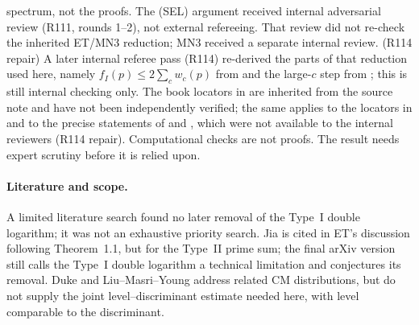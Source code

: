 \documentclass[10pt,reqno]{amsart}
\theoremstyle{definition}
\numberwithin{equation}{section}
\begin{document}
spectrum, not the proofs. The (SEL) argument received internal
adversarial review (R111, rounds 1--2), not external refereeing. That review did
not re-check the inherited ET/MN3 reduction; MN3 received a separate internal
review. (R114 repair) A later internal referee pass (R114) re-derived the
parts of that reduction used here, namely $f_I(p)\le2\sum_cw_c(p)$ from
\cite[Proposition~2.2, Lemma~2.8]{ET} and the large-$c$ step from
\cite[(8.1)--(8.2)]{ET}; this is still internal checking only.
The book locators in \cite{Iw} are inherited from the source note
and have not been independently verified; the same applies to the
locators in \cite{HR} and to the precise statements of \cite{MV} and
\cite{KS}, which were not available to the internal reviewers (R114 repair). Computational checks are not proofs.
The result needs expert scrutiny before it is relied upon.

\paragraph{Literature and scope.}
A limited literature search found no later removal of the Type~I double
logarithm; it was not an exhaustive priority search. Jia \cite{Jia} is cited
in ET's discussion following Theorem~1.1, but for the Type~II prime sum; the
final arXiv version still calls the Type~I double logarithm a technical
limitation and conjectures its removal. Duke \cite{Duke} and Liu--Masri--Young \cite{LMY} address related CM
distributions, but do not supply the joint level--discriminant estimate
needed here, with level comparable to the discriminant.
\end{document}
